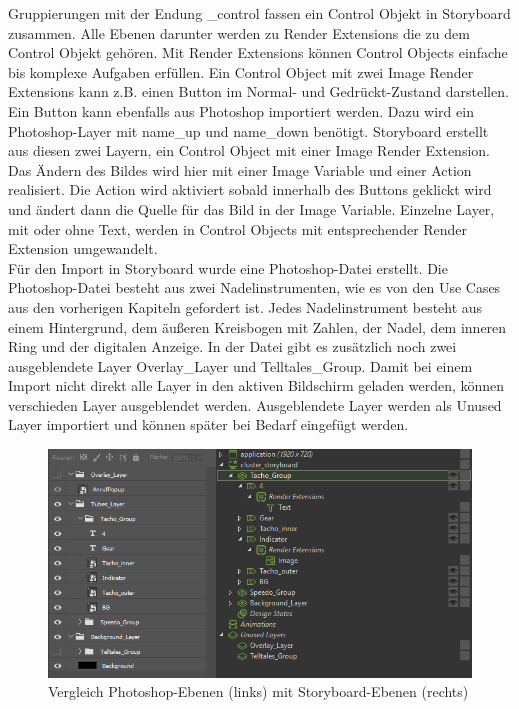 Gruppierungen mit der Endung \glqq \_control\grqq{} fassen ein Control Objekt in Storyboard zusammen. Alle Ebenen darunter werden zu Render Extensions die zu dem Control Objekt gehören. Mit Render Extensions können Control Objects einfache bis komplexe Aufgaben erfüllen. Ein Control Object mit zwei Image Render Extensions kann z.B. einen Button im Normal- und Gedrückt-Zustand darstellen.\\

Ein Button kann ebenfalls aus Photoshop importiert werden. Dazu wird ein Photoshop-Layer mit \glqq name\_up\grqq{} und \glqq name\_down\grqq{} benötigt. Storyboard erstellt aus diesen zwei Layern, ein Control Object mit einer Image Render Extension. Das Ändern des Bildes wird hier mit einer \glqq Image Variable\grqq{} und einer Action realisiert. Die Action wird aktiviert sobald innerhalb des Buttons geklickt wird und ändert dann die Quelle für das Bild in der \glqq Image Variable\grqq{}. Einzelne Layer, mit oder ohne Text, werden in Control Objects mit entsprechender Render Extension umgewandelt.\\


Für den Import in Storyboard wurde eine Photoshop-Datei erstellt. Die Photoshop-Datei besteht aus zwei Nadelinstrumenten, wie es von den Use Cases aus den vorherigen Kapiteln gefordert ist. Jedes Nadelinstrument besteht aus einem Hintergrund, dem äußeren Kreisbogen mit Zahlen, der Nadel, dem inneren Ring und der digitalen Anzeige. In der Datei gibt es zusätzlich noch zwei ausgeblendete Layer \glqq Overlay\_Layer\grqq{} und \glqq Telltales\_Group\grqq{}. Damit bei einem Import nicht direkt alle Layer in den aktiven Bildschirm geladen werden, können verschieden Layer ausgeblendet werden. Ausgeblendete Layer werden als \glqq Unused Layer\grqq{} importiert und können später bei Bedarf eingefügt werden.\\

\begin{figure}[htb]
	\centering
	\includegraphics[width=\textwidth]{img/3_entwicklung_neues_kontept/vgl_psd_story}
	\caption[Vergleich Photoshop-Ebenen mit Storyboard-Ebenen]{Vergleich Photoshop-Ebenen (links) mit Storyboard-Ebenen (rechts)}
	\label{fig:vgl_layer}
\end{figure}

